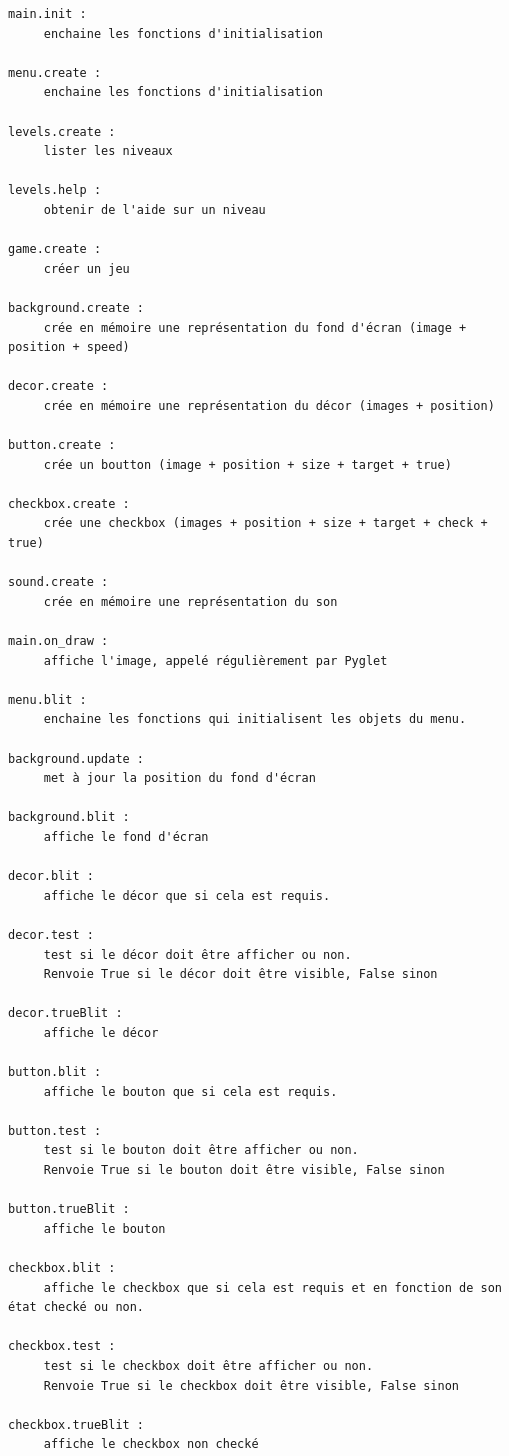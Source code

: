 \documentclass{article}
\begin{document}
\begin{verbatim}
main.init :
     enchaine les fonctions d'initialisation

menu.create :
     enchaine les fonctions d'initialisation

levels.create :
     lister les niveaux

levels.help :
     obtenir de l'aide sur un niveau

game.create :
     créer un jeu

background.create :
     crée en mémoire une représentation du fond d'écran (image + position + speed)

decor.create :
     crée en mémoire une représentation du décor (images + position)

button.create :
     crée un boutton (image + position + size + target + true)

checkbox.create :
     crée une checkbox (images + position + size + target + check + true)

sound.create :
     crée en mémoire une représentation du son

main.on_draw :
     affiche l'image, appelé régulièrement par Pyglet

menu.blit :
     enchaine les fonctions qui initialisent les objets du menu.

background.update :
     met à jour la position du fond d'écran

background.blit :
     affiche le fond d'écran

decor.blit :
     affiche le décor que si cela est requis.

decor.test :
     test si le décor doit être afficher ou non. 
     Renvoie True si le décor doit être visible, False sinon

decor.trueBlit :
     affiche le décor

button.blit :
     affiche le bouton que si cela est requis.

button.test :
     test si le bouton doit être afficher ou non.
     Renvoie True si le bouton doit être visible, False sinon

button.trueBlit :
     affiche le bouton

checkbox.blit :
     affiche le checkbox que si cela est requis et en fonction de son état checké ou non.

checkbox.test :
     test si le checkbox doit être afficher ou non.
     Renvoie True si le checkbox doit être visible, False sinon

checkbox.trueBlit :
     affiche le checkbox non checké


\end{verbatim}
\end{document}
